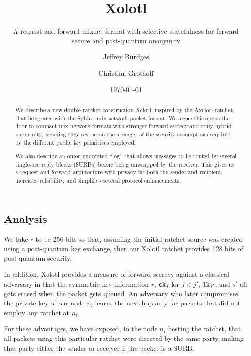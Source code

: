 \documentclass[twoside,letterpaper]{llncs}
\title{Xolotl}
\subtitle{A request-and-forward mixnet format with selective statefulness for forward secure and post-quantum anonymity}
\author{Jeffrey Burdges \and Christian Grothoff}
\date{\today}
\institute{Inria}
\begin{document}
\maketitle



\begin{abstract}
We describe a new double ratchet construction Xolotl, inspired by the
Axolotl ratchet, that integrates with the Sphinx mix network packet
format.  We argue this opens the door to compact mix network formats
with stronger forward secrecy and truly hybrid anonymity, meaning they
rest upon the stronger of the security assumptions required by the
different public key primitives employed.

We also describe an onion encrypted ``log'' that allows messages to
be routed by several single-use reply blocks (SURBs) before being
unwrapped by the receiver.  This gives us a request-and-forward
architecture with privacy for both the sender and recipient,
increases reliability, and simplifies several protocol enhancements.
\end{abstract}









\subsection{Analysis}

We take $r$ to be 256 bits so that, assuming the initial ratchet
source was created using a post-quantum key exchange, then our
Xolotl ratchet provides 128 bits of post-quantum security.

In addition, Xolotl provides a measure of forward secrecy against
a classical adversary in that the symmetric key information $r$,
$\texttt{ck}_j$ for $j<j'$, $\texttt{lk}_{j'}$, and $s'$ all gets erased when
the packet gets queued.  An adversary who later compromises the
private key of our node $n_i$ learns the next hop only for packets
that did not employ any ratchet at $n_i$.

For these advantages, we have exposed,
 to the node $n_i$ hosting the ratchet, that all packets using this
particular ratchet were directed by the same party, making that
party either the sender or receiver if the packet is a SURB.
\end{document}
